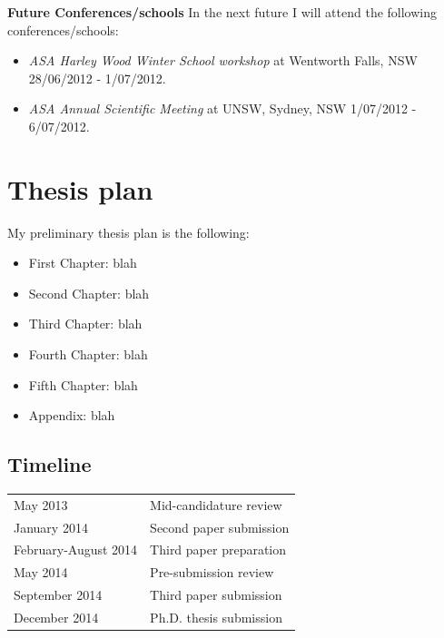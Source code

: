 \documentclass[useAMS,usenatbib,onecolumn]{mnras}
\begin{document}
	\textbf{Future Conferences/schools}
	In the next future I will attend the following conferences/schools:
	\begin{itemize}
		\item{\textit{ASA Harley Wood Winter School workshop}} at Wentworth Falls, NSW 28/06/2012 - 1/07/2012.
		\item{\textit{ASA Annual Scientific Meeting}} at UNSW, Sydney, NSW 1/07/2012 - 6/07/2012.
	\end{itemize}




\section{Thesis plan}
\label{sec:future}

My preliminary thesis plan is the following:
\begin{itemize}
\item{First Chapter: } blah
\item{Second Chapter:} blah
\item{Third Chapter:} blah
\item{Fourth Chapter:} blah
\item{Fifth Chapter:} blah
\item{Appendix:} blah
\end{itemize}



\subsection*{Timeline}

\begin{tabular*}{0.75\textwidth}{ l l }
  May 2013 		 							& Mid-candidature review \\
  January 2014								& Second paper submission \\
  February-August 2014		    			& Third paper preparation \\
  May 2014  								& Pre-submission review \\
  September 2014							& Third paper submission \\
  December 2014  							& Ph.D. thesis submission \\
\end{tabular*}

\begin{multicols}{2}
	
	{\footnotesize
	\setlength{\itemsep}{1pt}
	\begin{spacing}{0.5}
		{}
	\end{spacing}	}
\end{multicols}
\end{document}
